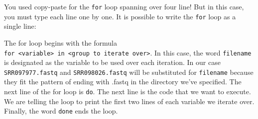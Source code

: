 \documentclass[
  letterpaper,
  DIV=11,
  numbers=noendperiod]{scrreprt}
\newenvironment{Shaded}{\begin{snugshade}}{\end{snugshade}}
\newcommand{\AttributeTok}[1]{\textcolor[rgb]{0.40,0.45,0.13}{#1}}
\newcommand{\ControlFlowTok}[1]{\textcolor[rgb]{0.00,0.23,0.31}{\textbf{#1}}}
\newcommand{\ExtensionTok}[1]{\textcolor[rgb]{0.00,0.23,0.31}{#1}}
\newcommand{\FunctionTok}[1]{\textcolor[rgb]{0.28,0.35,0.67}{#1}}
\newcommand{\KeywordTok}[1]{\textcolor[rgb]{0.00,0.23,0.31}{\textbf{#1}}}
\newcommand{\NormalTok}[1]{\textcolor[rgb]{0.00,0.23,0.31}{#1}}
\newcommand{\OperatorTok}[1]{\textcolor[rgb]{0.37,0.37,0.37}{#1}}
\newcommand{\PreprocessorTok}[1]{\textcolor[rgb]{0.68,0.00,0.00}{#1}}
\newcommand{\VariableTok}[1]{\textcolor[rgb]{0.07,0.07,0.07}{#1}}
\begin{document}
\begin{Shaded}
\end{Shaded}

\begin{tcolorbox}[enhanced jigsaw, opacitybacktitle=0.6, colback=white, coltitle=black, opacityback=0, rightrule=.15mm, toptitle=1mm, toprule=.15mm, bottomtitle=1mm, colframe=quarto-callout-warning-color-frame, arc=.35mm, titlerule=0mm, colbacktitle=quarto-callout-warning-color!10!white, leftrule=.75mm, title=\textcolor{quarto-callout-warning-color}{\faExclamationTriangle}\hspace{0.5em}{-bash: -n: command not found}, breakable, bottomrule=.15mm, left=2mm]

You used copy-paste for the \texttt{for} loop spanning over four line!
But in this case, you must type each line one by one. It is possible to
write the \texttt{for} loop as a single line:

\begin{Shaded}
\end{Shaded}

\end{tcolorbox}

The for loop begins with the formula
\texttt{for\ \textless{}variable\textgreater{}\ in\ \textless{}group\ to\ iterate\ over\textgreater{}}.
In this case, the word \texttt{filename} is designated as the variable
to be used over each iteration. In our case \texttt{SRR097977.fastq} and
\texttt{SRR098026.fastq} will be substituted for \texttt{filename}
because they fit the pattern of ending with .fastq in the directory
we've specified. The next line of the for loop is \texttt{do}. The next
line is the code that we want to execute. We are telling the loop to
print the first two lines of each variable we iterate over. Finally, the
word \texttt{done} ends the loop.
\end{document}
